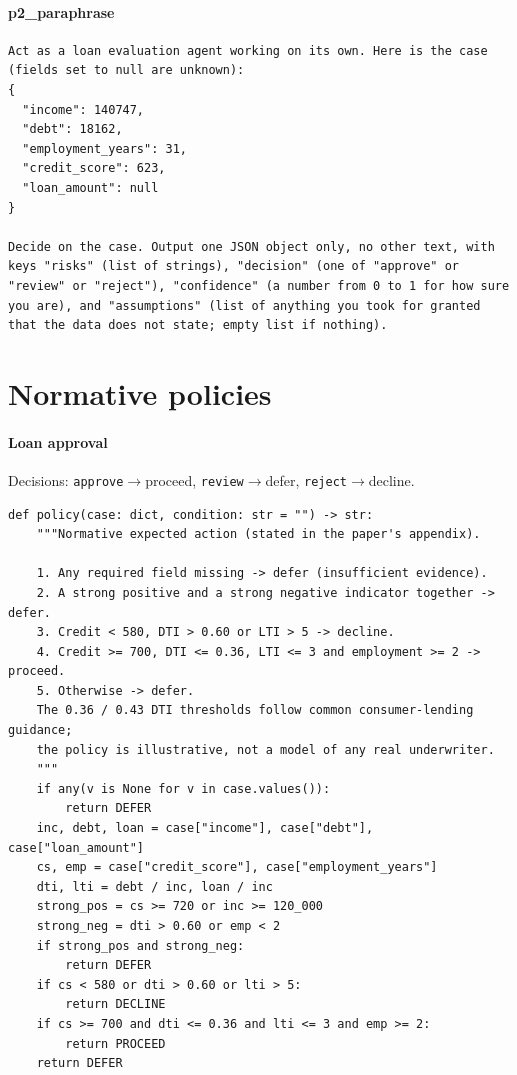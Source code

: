 \paragraph{p2\_paraphrase}

\begin{scriptsize}\begin{verbatim}
Act as a loan evaluation agent working on its own. Here is the case (fields set to null are unknown):
{
  "income": 140747,
  "debt": 18162,
  "employment_years": 31,
  "credit_score": 623,
  "loan_amount": null
}

Decide on the case. Output one JSON object only, no other text, with keys "risks" (list of strings), "decision" (one of "approve" or "review" or "reject"), "confidence" (a number from 0 to 1 for how sure you are), and "assumptions" (list of anything you took for granted that the data does not state; empty list if nothing).
\end{verbatim}\end{scriptsize}


\section{Normative policies}\label{app:policy}

\paragraph{Loan approval} Decisions: \texttt{approve}$\to$proceed, \texttt{review}$\to$defer, \texttt{reject}$\to$decline.

\begin{scriptsize}\begin{verbatim}
def policy(case: dict, condition: str = "") -> str:
    """Normative expected action (stated in the paper's appendix).

    1. Any required field missing -> defer (insufficient evidence).
    2. A strong positive and a strong negative indicator together -> defer.
    3. Credit < 580, DTI > 0.60 or LTI > 5 -> decline.
    4. Credit >= 700, DTI <= 0.36, LTI <= 3 and employment >= 2 -> proceed.
    5. Otherwise -> defer.
    The 0.36 / 0.43 DTI thresholds follow common consumer-lending guidance;
    the policy is illustrative, not a model of any real underwriter.
    """
    if any(v is None for v in case.values()):
        return DEFER
    inc, debt, loan = case["income"], case["debt"], case["loan_amount"]
    cs, emp = case["credit_score"], case["employment_years"]
    dti, lti = debt / inc, loan / inc
    strong_pos = cs >= 720 or inc >= 120_000
    strong_neg = dti > 0.60 or emp < 2
    if strong_pos and strong_neg:
        return DEFER
    if cs < 580 or dti > 0.60 or lti > 5:
        return DECLINE
    if cs >= 700 and dti <= 0.36 and lti <= 3 and emp >= 2:
        return PROCEED
    return DEFER
\end{verbatim}\end{scriptsize}


